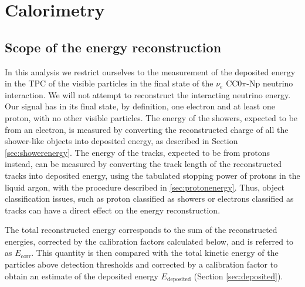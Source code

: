 
\section{Calorimetry}\label{sec:energyreco}
\subsection{Scope of the energy reconstruction}
In this analysis we restrict ourselves to the measurement of the deposited energy in the TPC of the visible particles in the final state of the $\nu_e$ CC0$\pi$-Np neutrino interaction. We will not attempt to reconstruct the interacting neutrino energy. Our signal has in its final state, by definition, one electron and at least one proton, with no other visible particles. The energy of the showers, expected to be from an electron, is measured by converting the reconstructed charge of all the shower-like objects into deposited energy, as described in Section \ref{sec:showerenergy}. The energy of the tracks, expected to be from protons instead, can be measured by converting the track length of the reconstructed tracks into deposited energy, using the tabulated stopping power of protons in the liquid argon, with the procedure described in \ref{sec:protonenergy}. Thus, object classification issues, such as proton classified as showers or electrons classified as tracks can have a direct effect on the energy reconstruction.

The total reconstructed energy corresponds to the sum of the reconstructed energies, corrected by the calibration factors calculated below, and is referred to as $E_{\mathrm{corr}}$. This quantity is then compared with the total kinetic energy of the particles above detection thresholds and corrected by a calibration factor to obtain an estimate of the deposited energy $E_{\mathrm{deposited}}$ (Section \ref{sec:deposited}).



